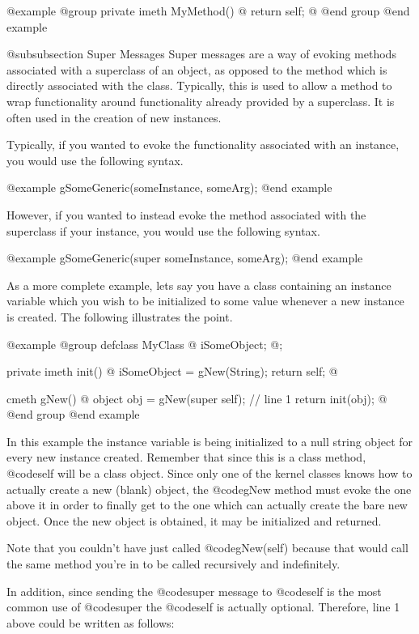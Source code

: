 @example
@group
private imeth   MyMethod()
@{
        return self;
@}
@end group
@end example


@subsubsection Super Messages
Super messages are a way of evoking methods associated with a superclass
of an object, as opposed to the method which is directly associated
with the class.  Typically, this is used to allow a method to wrap
functionality around functionality already provided by a superclass.
It is often used in the creation of new instances.

Typically, if you wanted to evoke the functionality associated with an
instance, you would use the following syntax.

@example
        gSomeGeneric(someInstance, someArg);
@end example

However, if you wanted to instead evoke the method associated with the
superclass if your instance, you would use the following syntax.

@example
        gSomeGeneric(super  someInstance, someArg);
@end example

As a more complete example, lets say you have a class containing an
instance variable which you wish to be initialized to some value
whenever a new instance is created.  The following illustrates the
point.

@example
@group
defclass  MyClass  @{
        iSomeObject;
@};

private imeth init()
@{
        iSomeObject = gNew(String);
        return self;
@}

cmeth  gNew()
@{
        object  obj = gNew(super self);  // line 1
        return init(obj);
@}
@end group
@end example

In this example the instance variable is being initialized to a null
string object for every new instance created.  Remember that since
this is a class method, @code{self} will be a class object.  Since
only one of the kernel classes knows how to actually create a new
(blank) object, the @code{gNew} method must evoke the one above it
in order to finally get to the one which can actually create the
bare new object.  Once the new object is obtained, it may be initialized
and returned.

Note that you couldn't have just called @code{gNew(self)}
because that would call the same method you're in to be called
recursively and indefinitely.

In addition, since sending the @code{super} message to @code{self}
is the most common use of @code{super} the @code{self} is
actually optional.  Therefore, line 1 above could be written as follows:

